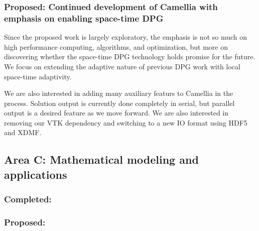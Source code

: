 \documentclass{report}
\begin{document}
 \subsubsection*{Proposed: Continued development of Camellia with emphasis on enabling space-time DPG}
Since the proposed work is largely exploratory, the emphasis is not so much on high performance computing, algorithms, and optimization, but more on discovering whether the space-time DPG technology holds promise for the future. We focus on extending the adaptive nature of previous DPG work with local space-time adaptivity.

We are also interested in adding many auxiliary featurs to Camellia in the process. Solution output is currently done completely in serial, but parallel output is a desired feature as we move forward. We are also interested in removing our VTK dependency and switching to a new IO format using HDF5 and XDMF.

\subsection{Area C: Mathematical modeling and applications}
\subsubsection*{Completed:}
\subsubsection*{Proposed:}



\end{document}
